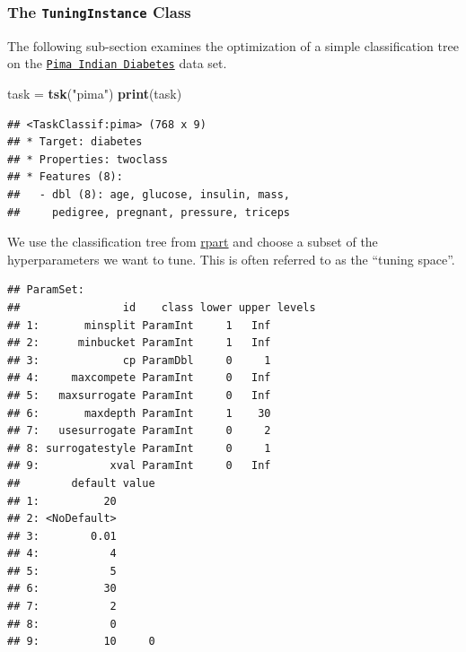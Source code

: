 \documentclass[]{article}
\newenvironment{Shaded}{\begin{snugshade}}{\end{snugshade}}
\newcommand{\KeywordTok}[1]{\textcolor[rgb]{0.13,0.29,0.53}{\textbf{#1}}}
\newcommand{\NormalTok}[1]{#1}
\newcommand{\OperatorTok}[1]{\textcolor[rgb]{0.81,0.36,0.00}{\textbf{#1}}}
\newcommand{\StringTok}[1]{\textcolor[rgb]{0.31,0.60,0.02}{#1}}
\renewenvironment{Shaded} {\begin{snugshade}\small} {\end{snugshade}}
\begin{document}
\hypertarget{tuning-optimization}{%
\subsubsection{\texorpdfstring{The \texttt{TuningInstance} Class}{The TuningInstance Class}}\label{tuning-optimization}}

The following sub-section examines the optimization of a simple classification tree on the \href{https://mlr3.mlr-org.com/reference/mlr_tasks_pima.html}{\texttt{Pima\ Indian\ Diabetes}} data set.

\begin{Shaded}
\begin{Highlighting}[]
\NormalTok{task =}\StringTok{ }\KeywordTok{tsk}\NormalTok{(}\StringTok{"pima"}\NormalTok{)}
\KeywordTok{print}\NormalTok{(task)}
\end{Highlighting}
\end{Shaded}

\begin{verbatim}
## <TaskClassif:pima> (768 x 9)
## * Target: diabetes
## * Properties: twoclass
## * Features (8):
##   - dbl (8): age, glucose, insulin, mass,
##     pedigree, pregnant, pressure, triceps
\end{verbatim}

We use the classification tree from \href{https://cran.r-project.org/package=rpart}{rpart} and choose a subset of the hyperparameters we want to tune.
This is often referred to as the ``tuning space''.

\begin{Shaded}
\end{Shaded}

\begin{verbatim}
## ParamSet: 
##                id    class lower upper levels
## 1:       minsplit ParamInt     1   Inf       
## 2:      minbucket ParamInt     1   Inf       
## 3:             cp ParamDbl     0     1       
## 4:     maxcompete ParamInt     0   Inf       
## 5:   maxsurrogate ParamInt     0   Inf       
## 6:       maxdepth ParamInt     1    30       
## 7:   usesurrogate ParamInt     0     2       
## 8: surrogatestyle ParamInt     0     1       
## 9:           xval ParamInt     0   Inf       
##        default value
## 1:          20      
## 2: <NoDefault>      
## 3:        0.01      
## 4:           4      
## 5:           5      
## 6:          30      
## 7:           2      
## 8:           0      
## 9:          10     0
\end{verbatim}
\end{document}
